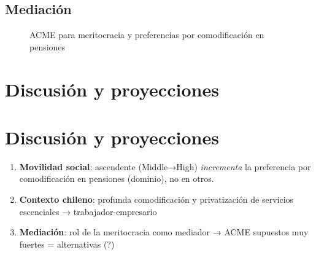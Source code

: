 \documentclass[
  spanish,
  letterpaper,
  DIV=11,
  numbers=noendperiod,
  oneside]{scrartcl}
\providecommand{\tightlist}{%
  \setlength{\itemsep}{0pt}\setlength{\parskip}{0pt}}
\begin{document}
\subsection{Mediación}\label{mediaciuxf3n}

\begin{figure}

\caption{\label{fig-acme}ACME para meritocracia y preferencias por
comodificación en pensiones}


\end{figure}%

\section{Discusión y proyecciones}\label{discusiuxf3n-y-proyecciones}

\section{Discusión y proyecciones}\label{discusiuxf3n-y-proyecciones-1}

\begin{enumerate}
\def\labelenumi{\arabic{enumi}.}
\tightlist
\item
  \textbf{Movilidad social}: ascendente (Middle→High) \emph{incrementa}
  la preferencia por comodificación en pensiones (dominio), no en otros.
\item
  \textbf{Contexto chileno}: profunda comodificación y privatización de
  servicios escenciales → trabajador-empresario
\item
  \textbf{Mediación}: rol de la meritocracia como mediador → ACME
  supuestos muy fuertes = alternativas (?)
\end{enumerate}
\end{document}
